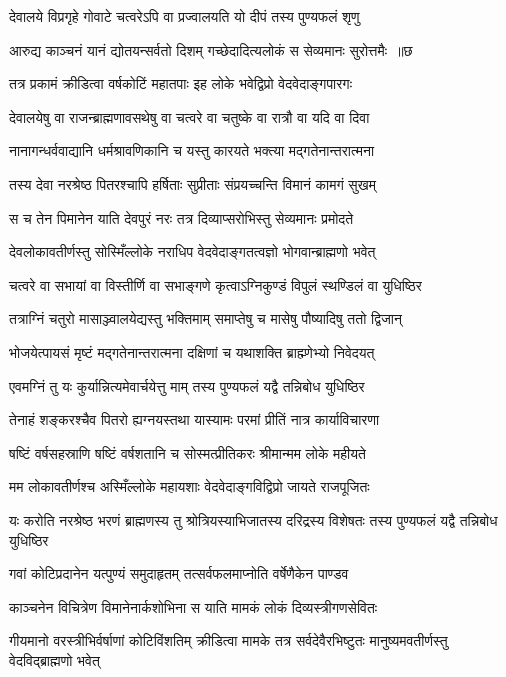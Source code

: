 \twolineshloka
{देवालये विप्रगृहे गोवाटे चत्वरेऽपि वा}
{प्रज्वालयति यो दीपं तस्य पुण्यफलं शृणु}


\twolineshloka
{आरुद्य काञ्चनं यानं द्योतयन्सर्वतो दिशम्}
{गच्छेदादित्यलोकं स सेव्यमानः सुरोत्तमैः ॥छ}


\twolineshloka
{तत्र प्रकामं क्रीडित्वा वर्षकोटिं महातपाः}
{इह लोके भवेद्विप्रो वेदवेदाङ्गपारगः}


\twolineshloka
{देवालयेषु वा राजन्ब्राह्मणावसथेषु वा}
{चत्वरे वा चतुष्के वा रात्रौ वा यदि वा दिवा}


\twolineshloka
{नानागन्धर्ववाद्यानि धर्मश्रावणिकानि च}
{यस्तु कारयते भक्त्या मद्गतेनान्तरात्मना}


\twolineshloka
{तस्य देवा नरश्रेष्ठ पितरश्चापि हर्षिताः}
{सुप्रीताः संप्रयच्चन्ति विमानं कामगं सुखम्}


\twolineshloka
{स च तेन पिमानेन याति देवपुरं नरः}
{तत्र दिव्याप्सरोभिस्तु सेव्यमानः प्रमोदते}


\twolineshloka
{देवलोकावतीर्णस्तु सोस्मिँल्लोके नराधिप}
{वेदवेदाङ्गतत्वज्ञो भोगवान्ब्राह्मणो भवेत्}


\twolineshloka
{चत्वरे वा सभायां वा विस्तीर्णि वा सभाङ्गणे}
{कृत्वाऽग्निकुण्डं विपुलं स्थण्डिलं वा युधिष्ठिर}


\twolineshloka
{तत्राग्निं चतुरो मासाञ्ज्वालयेद्यस्तु भक्तिमाम्}
{समाप्तेषु च मासेषु पौष्यादिषु ततो द्विजान्}


\twolineshloka
{भोजयेत्पायसं मृष्टं मद्गतेनान्तरात्मना}
{दक्षिणां च यथाशक्ति ब्राह्म्णेभ्यो निवेदयत्}


\twolineshloka
{एवमग्निं तु यः कुर्यान्नित्यमेवार्चयेत्तु माम्}
{तस्य पुण्यफलं यद्वै तन्निबोध युधिष्ठिर}


\twolineshloka
{तेनाहं शङ्करश्चैव पितरो ह्यग्नयस्तथा}
{यास्यामः परमां प्रीतिं नात्र कार्याविचारणा}


\twolineshloka
{षष्टिं वर्षसहस्राणि षष्टिं वर्षशतानि च}
{सोस्मत्प्रीतिकरः श्रीमान्मम लोके महीयते}


\twolineshloka
{मम लोकावतीर्णश्च अस्मिँल्लोके महायशाः}
{वेदवेदाङ्गविद्विप्रो जायते राजपूजितः}


\threelineshloka
{यः करोति नरश्रेष्ठ भरणं ब्राह्मणस्य तु}
{श्रोत्रियस्याभिजातस्य दरिद्रस्य विशेषतः}
{तस्य पुण्यफलं यद्वै तन्निबोध युधिष्ठिर}


\twolineshloka
{गवां कोटिप्रदानेन यत्पुण्यं समुदाहृतम्}
{तत्सर्वफलमाप्नोति वर्षेणैकेन पाण्डव}


\twolineshloka
{काञ्चनेन विचित्रेण विमानेनार्कशोभिना}
{स याति मामकं लोकं दिव्यस्त्रीगणसेवितः}


\threelineshloka
{गीयमानो वरस्त्रीभिर्वर्षाणां कोटिविंशतिम्}
{क्रीडित्वा मामके तत्र सर्वदेवैरभिष्टुतः}
{मानुष्यमवतीर्णस्तु वेदविद्ब्राह्मणो भवेत्}


